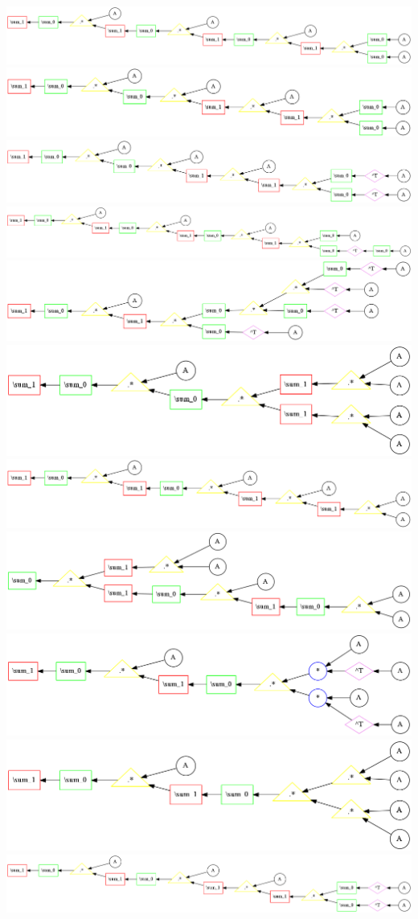 \begin{center}
\includegraphics[width=0.45\linewidth]{trees/RBM_5_horizontal_11.png}
\includegraphics[width=0.45\linewidth]{trees/RBM_5_horizontal_12.png}
\includegraphics[width=0.45\linewidth]{trees/RBM_5_horizontal_13.png}
\includegraphics[width=0.45\linewidth]{trees/RBM_5_horizontal_14.png}
\includegraphics[width=0.45\linewidth]{trees/RBM_5_horizontal_15.png}
\includegraphics[width=0.45\linewidth]{trees/RBM_5_horizontal_16.png}
\includegraphics[width=0.45\linewidth]{trees/RBM_5_horizontal_17.png}
\includegraphics[width=0.45\linewidth]{trees/RBM_5_horizontal_18.png}
\includegraphics[width=0.45\linewidth]{trees/RBM_5_horizontal_19.png}
\includegraphics[width=0.45\linewidth]{trees/RBM_5_horizontal_20.png}
\includegraphics[width=0.45\linewidth]{trees/RBM_5_horizontal_21.png}

\end{center}
